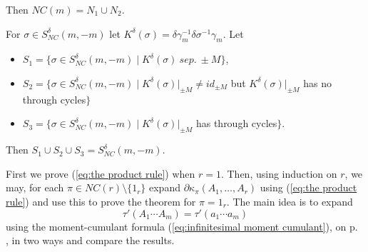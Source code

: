 \documentclass[11pt]{amsart}
\theoremstyle{definition}
\numberwithin{theorem}{section}
\newcommand{\NC}{\mathit{NC}}
\newcommand{\sep}{\mathit{\ sep.\ }}
\newcommand{\id}{\mathit{id}}
\begin{document}
\medskip\noindent
Then $\NC(m) = N_1 \cup N_2$. 

For $\sigma \in S_\NC^\delta(m, -m)$ let $K^\delta(\sigma) = \delta \gamma_m^{-1} \delta \sigma^{-1} \gamma_m$.  Let
\begin{itemize}\itemsep1em

\item
$S_1 = \{ \sigma \in S_\NC^\delta(m, -m) \mid K^\delta(\sigma) \sep \pm M\}$, 

\item
$S_2 = \{ \sigma \in S_\NC^\delta(m, -m) \mid K^\delta(\sigma)|_{\pm M} \not= \id_{\pm M}$ but $K^\delta(\sigma)|_{\pm M}$ has no through cycles$\}$

\item
$S_3 = \{ \sigma \in S_\NC^\delta(m, -m) \mid K^\delta(\sigma)|_{\pm M}$ has through cycles$\}$.

\end{itemize}\medskip

\noindent
Then $S_1 \cup S_2 \cup S_3 = S_\NC^\delta(m, -m)$. 



First we prove (\ref{eq:the product rule}) when $r =
1$. Then, using induction on $r$, we may, for each $\pi \in
\NC(r) \setminus \{ 1_r \}$ expand $\partial \kappa_\pi(A_1,
\dots, A_r)$ using (\ref{eq:the product rule}) and use this
to prove the theorem for $\pi = 1_r$. The main idea is to
expand
\[
\tau'(A_1 \cdots A_m)
=
\tau'(a_1 \cdots a_m)
\]
using the moment-cumulant formula (\ref{eq:infinitesimal
  moment cumulant}), on p.~ \pageref{eq:infinitesimal moment
  cumulant}, in two ways and compare the results.
\end{document}
